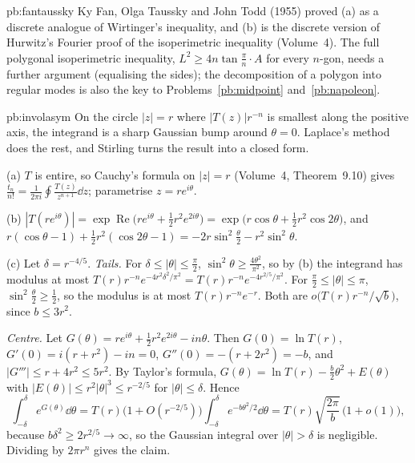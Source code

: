 \begin{solution}{pb:fantaussky}
\leads Ky Fan, Olga Taussky and John Todd (1955) proved (a) as a discrete analogue of Wirtinger's inequality, and (b) is the discrete
version of Hurwitz's Fourier proof of the isoperimetric inequality (Volume~4). The full polygonal isoperimetric inequality,
$L^2\ge4n\tan\frac\pi n\cdot A$ for every $n$-gon, needs a further argument (equalising the sides); the decomposition of a polygon into regular
modes is also the key to Problems~\ref{pb:midpoint} and~\ref{pb:napoleon}.
\end{solution}

\begin{solution}{pb:involasym}
\idea On the circle $|z|=r$ where $|T(z)|r^{-n}$ is smallest along the positive axis, the integrand is a sharp Gaussian bump around $\theta=0$. Laplace's method
does the rest, and Stirling turns the result into a closed form.

\writeup (a) $T$ is entire, so Cauchy's formula on $|z|=r$ (Volume~4, Theorem~9.10) gives $\frac{t_n}{n!}=\frac1{2\pi i}\oint\frac{T(z)}{z^{n+1}}\dd z$; parametrise $z=re^{i\theta}$.

(b) $|T(re^{i\theta})|=\exp\operatorname{Re}\bigl(re^{i\theta}+\frac12r^2e^{2i\theta}\bigr)=\exp\bigl(r\cos\theta+\frac12r^2\cos2\theta\bigr)$, and
$r(\cos\theta-1)+\frac12r^2(\cos2\theta-1)=-2r\sin^2\frac\theta2-r^2\sin^2\theta$.

(c) Let $\delta=r^{-4/5}$. \emph{Tails.} For $\delta\le|\theta|\le\frac\pi2$, $\sin^2\theta\ge\frac{4\theta^2}{\pi^2}$, so by (b) the integrand has modulus at most
$T(r)r^{-n}e^{-4r^2\delta^2/\pi^2}=T(r)r^{-n}e^{-4r^{2/5}/\pi^2}$. For $\frac\pi2\le|\theta|\le\pi$, $\sin^2\frac\theta2\ge\frac12$, so the modulus is at most $T(r)r^{-n}e^{-r}$. Both are
$o\bigl(T(r)r^{-n}/\sqrt b\bigr)$, since $b\le3r^2$.

\emph{Centre.} Let $G(\theta)=re^{i\theta}+\frac12r^2e^{2i\theta}-in\theta$. Then $G(0)=\ln T(r)$, $G'(0)=i(r+r^2)-in=0$, $G''(0)=-(r+2r^2)=-b$, and $|G'''|\le r+4r^2\le5r^2$. By Taylor's formula,
$G(\theta)=\ln T(r)-\frac b2\theta^2+E(\theta)$ with $|E(\theta)|\le r^2|\theta|^3\le r^{-2/5}$ for $|\theta|\le\delta$. Hence
\[
\int_{-\delta}^\delta e^{G(\theta)}\dd\theta=T(r)\bigl(1+O(r^{-2/5})\bigr)\int_{-\delta}^\delta e^{-b\theta^2/2}\dd\theta=T(r)\sqrt{\frac{2\pi}b}\,\bigl(1+o(1)\bigr),
\]
because $b\delta^2\ge2r^{2/5}\to\infty$, so the Gaussian integral over $|\theta|>\delta$ is negligible. Dividing by $2\pi r^n$ gives the claim.


\end{solution}
